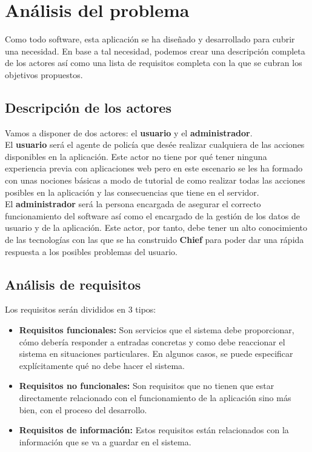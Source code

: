 \chapter{Análisis del problema}
 
 Como todo software, esta aplicación se ha diseñado y desarrollado para cubrir una
 necesidad. En base a tal necesidad, podemos crear una descripción completa de los 
 actores así como una lista de requisitos completa con la que se cubran los objetivos 
 propuestos.

\section{Descripción de los actores}
Vamos a disponer de dos actores: el \textbf{usuario} y el \textbf{administrador}.\\

El \textbf{usuario} será el agente de policía que desée realizar cualquiera de las acciones
disponibles en la aplicación. Este actor no tiene por qué tener ninguna experiencia previa
con aplicaciones web pero en este escenario se les ha formado con unas nociones básicas 
a modo de tutorial de como realizar todas las acciones posibles en la aplicación y las consecuencias
que tiene en el servidor.\\

El \textbf{administrador} será la persona encargada de asegurar el correcto funcionamiento 
del software así como el encargado de la gestión de los datos de usuario y de la aplicación. Este
actor, por tanto, debe tener un alto conocimiento de las tecnologías con las que se ha construido
\textbf{Chief} para poder dar una rápida respuesta a los posibles problemas del usuario.

\section{Análisis de requisitos}

Los requisitos serán divididos en 3 tipos:

\begin{itemize}
   \item \textbf{Requisitos funcionales:} Son servicios que el sistema debe proporcionar, cómo
   debería responder a entradas concretas y como debe reaccionar el sistema en situaciones 
   particulares. En algunos casos, se puede especificar explícitamente qué no debe hacer el sistema.

   \item \textbf{Requisitos no funcionales:} Son requisitos que no tienen que estar directamente relacionado
   con el funcionamiento de la aplicación sino más bien, con el proceso del desarrollo.
   
   \item \textbf{Requisitos de información:} Estos requisitos están relacionados con la información 
   que se va a guardar en el sistema.

\end{itemize}

